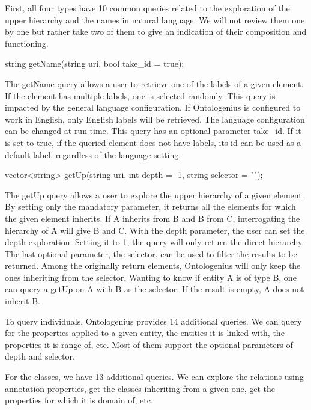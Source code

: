 First, all four types have 10 common queries related to the exploration of the upper hierarchy and the names in natural language. We will not review them one by one but rather take two of them to give an indication of their composition and functioning. 

\begin{verbatimtab}
string getName(string uri, 
               bool take_id = true);
\end{verbatimtab}

The getName query allows a user to retrieve one of the labels of a given element. If the element has multiple labels, one is selected randomly. This query is impacted by the general language configuration. If Ontologenius is configured to work in English, only English labels will be retrieved. The language configuration can be changed at run-time. This query has an optional parameter take\_id. If it is set to true, if the queried element does not have labels, its id can be used as a default label, regardless of the language setting. 

\begin{verbatimtab}
vector<string> getUp(string uri,
                     int depth = -1, 
                     string selector = "");
\end{verbatimtab}

The getUp query allows a user to explore the upper hierarchy of a given element. By setting only the mandatory parameter, it returns all the elements for which the given element inherits. If A inherits from B and B from C, interrogating the hierarchy of A will give B and C. With the depth parameter, the user can set the depth exploration. Setting it to 1, the query will only return the direct hierarchy. The last optional parameter, the selector, can be used to filter the results to be returned. Among the originally return elements, Ontologenius will only keep the ones inheriting from the selector. Wanting to know if entity A is of type B, one can query a getUp on A with B as the selector. If the result is empty, A does not inherit B.

To query individuals, Ontologenius provides 14 additional queries. We can query for the properties applied to a given entity, the entities it is linked with, the properties it is range of, etc. Most of them support the optional parameters of depth and selector.

For the classes, we have 13 additional queries. We can explore the relations using annotation properties, get the classes inheriting from a given one, get the properties for which it is domain of, etc.

